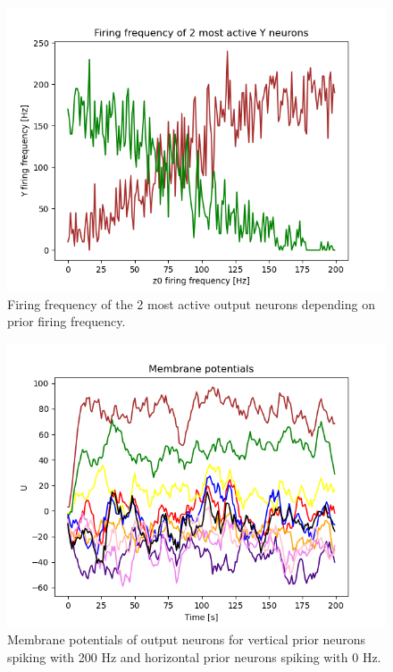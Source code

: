 \begin{figure}
  \includegraphics[width=\linewidth]{figures/horvertAdaptiveInh/YFrequency_prior199.png}
  \caption{ Firing frequency of the 2 most active output neurons depending on prior firing frequency. }
  \label{fig:horvertAdaptiveInhibitionVariablePriorValFrequency}
\end{figure}

\begin{figure}
  \includegraphics[width=\linewidth]{figures/horvertAdaptiveInh/membranePotentials0.png}
  \caption{ Membrane potentials of output neurons for vertical prior neurons spiking with 200 Hz and horizontal prior neurons spiking with 0 Hz. }
  \label{fig:horvertAdaptiveInhibitionVariablePriorValMembranePotentials}
\end{figure}